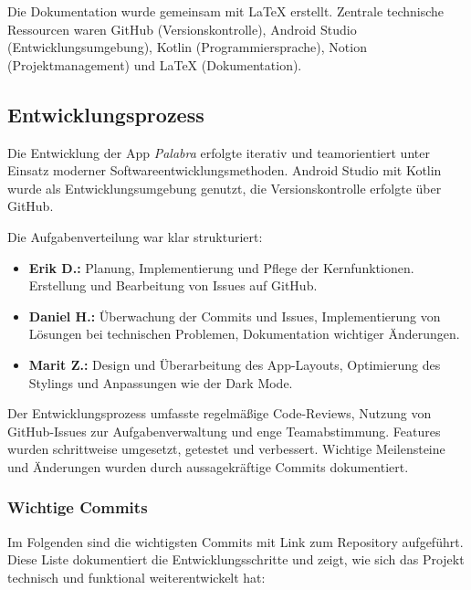 \documentclass[12pt,a4paper]{article}
\begin{document}
Die Dokumentation wurde gemeinsam mit LaTeX erstellt. Zentrale technische Ressourcen waren GitHub (Versionskontrolle), Android Studio (Entwicklungsumgebung), Kotlin (Programmiersprache), Notion (Projektmanagement) und LaTeX (Dokumentation).

\subsection{Entwicklungsprozess}
Die Entwicklung der App \textit{Palabra} erfolgte iterativ und teamorientiert unter Einsatz moderner Softwareentwicklungsmethoden. Android Studio mit Kotlin wurde als Entwicklungsumgebung genutzt, die Versionskontrolle erfolgte über GitHub.

Die Aufgabenverteilung war klar strukturiert:
\begin{itemize}
    \item \textbf{Erik D.:} Planung, Implementierung und Pflege der Kernfunktionen. Erstellung und Bearbeitung von Issues auf GitHub.
    \item \textbf{Daniel H.:} Überwachung der Commits und Issues, Implementierung von Lösungen bei technischen Problemen, Dokumentation wichtiger Änderungen.
    \item \textbf{Marit Z.:} Design und Überarbeitung des App-Layouts, Optimierung des Stylings und Anpassungen wie der Dark Mode.
\end{itemize}

Der Entwicklungsprozess umfasste regelmäßige Code-Reviews, Nutzung von GitHub-Issues zur Aufgabenverwaltung und enge Teamabstimmung. Features wurden schrittweise umgesetzt, getestet und verbessert. Wichtige Meilensteine und Änderungen wurden durch aussagekräftige Commits dokumentiert.

\subsubsection{Wichtige Commits}
Im Folgenden sind die wichtigsten Commits mit Link zum Repository aufgeführt. Diese Liste dokumentiert die Entwicklungsschritte und zeigt, wie sich das Projekt technisch und funktional weiterentwickelt hat:
\end{document}
